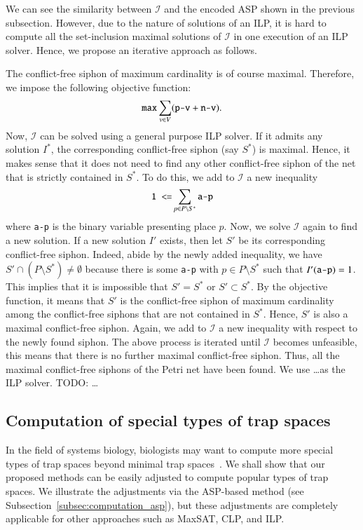 \documentclass[preprint,12pt]{elsarticle}
\begin{document}
We can see the similarity between \(\mathcal{I}\) and the encoded ASP shown in the previous subsection.
However, due to the nature of solutions of an ILP, it is hard to compute all the set-inclusion maximal solutions of \(\mathcal{I}\) in one execution of an ILP solver.
Hence, we propose an iterative approach as follows.

The conflict-free siphon of maximum cardinality is of course maximal.
Therefore, we impose the following objective function:
\[
  \verb|max| \sum_{v \in V}(\verb|p-v| + \verb|n-v|).
\]
Now, \(\mathcal{I}\) can be solved using a general purpose ILP solver.
If it admits any solution \(I^{*}\), the corresponding conflict-free siphon (say \(S^{*}\)) is maximal.
Hence, it makes sense that it does not need to find any other conflict-free siphon of the net that is strictly contained in \(S^{*}\).
To do this, we add to \(\mathcal{I}\) a new inequality
\[
  \verb|1 <=| \sum_{p \in P \setminus S^{*}} \verb|a-p|
\]
where \verb|a-p| is the binary variable presenting place \(p\).
Now, we solve \(\mathcal{I}\) again to find a new solution.
If a new solution \(I'\) exists, then let \(S'\) be its corresponding conflict-free siphon.
Indeed, abide by the newly added inequality, we have \(S' \cap (P \setminus S^{*}) \neq \emptyset\) because there is some \verb|a-p| with \(p \in P \setminus S^{*}\) such that \(I'(\verb|a-p|) = 1\).
This implies that it is impossible that \(S' = S^{*}\) or \(S' \subset S^{*}\).
By the objective function, it means that \(S'\) is the conflict-free siphon of maximum cardinality among the conflict-free siphons that are not contained in \(S^{*}\).
Hence, \(S'\) is also a maximal conflict-free siphon.
Again, we add to \(\mathcal{I}\) a new inequality with respect to the newly found siphon.
The above process is iterated until \(\mathcal{I}\) becomes unfeasible, this means that there is no further maximal conflict-free siphon.
Thus, all the maximal conflict-free siphons of the Petri net have been found.
We use \dots as the ILP solver. TODO: \dots

\subsection{Computation of special types of trap spaces}
\label{subsec:computation_special_ts}

In the field of systems biology, biologists may want to compute more special types of trap spaces beyond minimal trap spaces~\cite{klarner2017pyboolnet}.
We shall show that our proposed methods can be easily adjusted to compute popular types of trap spaces.
We illustrate the adjustments via the ASP-based method (see Subsection~\ref{subsec:computation_asp}), but these adjustments are completely applicable for other approaches such as MaxSAT, CLP, and ILP.
\end{document}
